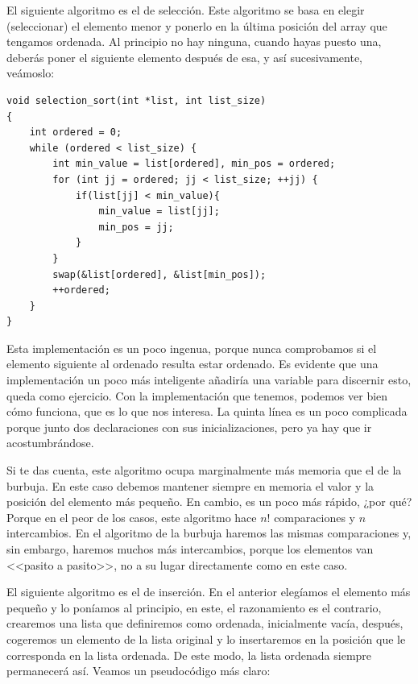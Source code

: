 \documentclass[a4paper]{article}
\begin{document}
El siguiente algoritmo es el de selección. Este algoritmo se basa en elegir
(seleccionar) el elemento menor y ponerlo en la última posición del array
que tengamos ordenada. Al principio no hay ninguna, cuando hayas puesto una,
deberás poner el siguiente elemento después de esa, y así sucesivamente,
veámoslo:

\noindent
\begin{minipage}[H]{\linewidth}
\mbox{}
\begin{lstlisting}[style=C,
caption={Algoritmo de selección},
label={lst:selectionSort}]
void selection_sort(int *list, int list_size)
{
    int ordered = 0;
    while (ordered < list_size) {
        int min_value = list[ordered], min_pos = ordered;
        for (int jj = ordered; jj < list_size; ++jj) {
            if(list[jj] < min_value){
                min_value = list[jj];
                min_pos = jj;
            }
        }
        swap(&list[ordered], &list[min_pos]);
        ++ordered;
    }
}
\end{lstlisting}
\end{minipage}

Esta implementación es un poco ingenua, porque nunca comprobamos si el elemento
siguiente al ordenado resulta estar ordenado. Es evidente que una implementación
un poco más inteligente añadiría una variable para discernir esto, queda como
ejercicio. Con la implementación que tenemos, podemos ver bien cómo funciona,
que es lo que nos interesa. La quinta línea es un poco complicada porque junto
dos declaraciones con sus inicializaciones, pero ya hay que ir acostumbrándose.

Si te das cuenta, este algoritmo ocupa marginalmente más memoria que el de la
burbuja. En este caso debemos mantener siempre en memoria el valor y la
posición del elemento más pequeño. En cambio, es un poco más rápido, ¿por qué?
Porque en el peor de los casos, este algoritmo hace $n!$ comparaciones y
$n$ intercambios. En el algoritmo de la burbuja haremos las mismas comparaciones
y, sin embargo, haremos muchos más intercambios, porque los elementos van
<<pasito a pasito>>, no a su lugar directamente como en este caso.

El siguiente algoritmo es el de inserción. En el anterior elegíamos el elemento
más pequeño y lo poníamos al principio, en este, el razonamiento es el
contrario, crearemos una lista que definiremos como ordenada, inicialmente
vacía, después, cogeremos un elemento de la lista original y lo insertaremos
en la posición que le corresponda en la lista ordenada. De este modo, la lista
ordenada siempre permanecerá así. Veamos un pseudocódigo más claro:
\end{document}
